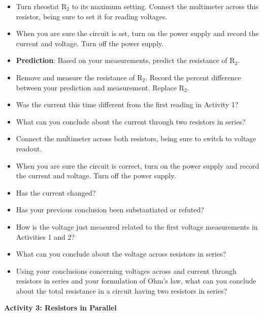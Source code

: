 \begin{itemize}
\item Turn rheostat R\( _{2} \) to its maximum setting. Connect the multimeter
across this resistor, being sure to set it for reading voltages.
\item When you are sure the circuit is set, turn on the power supply and
record the current and voltage. Turn off the power supply.\vspace{10mm}

\item \textbf{Prediction}: Based on your measurements, predict the resistance
of R\( _{2} \).\vspace{15mm}

\item Remove and measure the resistance of R\( _{2} \). Record the percent
difference between your prediction and measurement. Replace R\( _{2} \).\vspace{30mm}

\item Was the current this time different from the first reading in Activity
1?\vspace{15mm}

\item What can you conclude about the current through two resistors in series?\vspace{15mm}

\item Connect the multimeter across both resistors, being sure to switch
to voltage readout.
\item When you are sure the circuit is correct, turn on the power supply
and record the current and voltage. Turn off the power supply.\vspace{10mm}

\item Has the current changed?\vspace{15mm}

\item Has your previous conclusion been substantiated or refuted?\vspace{15mm}

\item How is the voltage just measured related to the first voltage measurements
in Activities 1 and 2?\vspace{15mm}

\item What can you conclude about the voltage across resistors in series?\vspace{15mm}

\item Using your conclusions concerning voltages across and current through
resistors in series and your formulation of Ohm's law, what can you
conclude about the total resistance in a circuit having two resistors
in series?\vspace{15mm}

\end{itemize}
\textbf{Activity 3: Resistors in Parallel}


